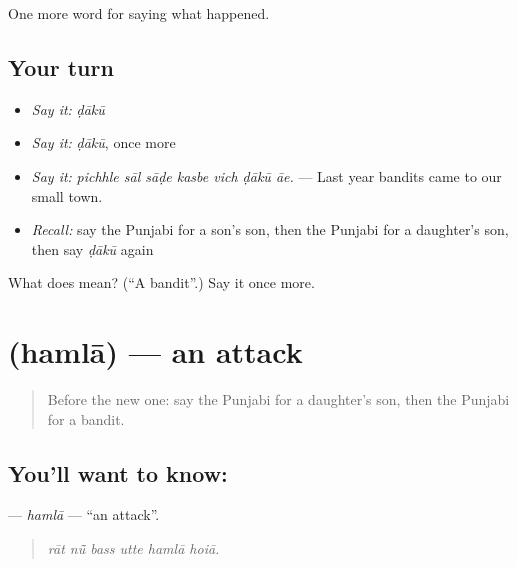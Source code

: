 \begin{grammarlens}[title={What you've built}]
One more word for saying what happened.
\end{grammarlens}

\subsection*{Your turn}
\begin{itemize}
\raggedright
  \item \emph{Say it:} \emph{ḍākū}
  \item \emph{Say it:} \emph{ḍākū}, once more
  \item \emph{Say it:} \emph{pichhle sāl sāḍe kasbe vich ḍākū āe.} — Last year bandits came to our small town.
  \item \emph{Recall:} say the Punjabi for a son's son, then the Punjabi for a daughter's son, then say \emph{ḍākū} again
\end{itemize}

\begin{tcolorbox}[breakable,colback=teal!4,colframe=teal!35!black,title={Before you move on}]
What does  mean? (\textquotedblleft{}A bandit\textquotedblright{}.) Say it once more.
\end{tcolorbox}
\section[\texorpdfstring{\pa{ਹਮਲਾ} (hamlā)}{ਹਮਲਾ (hamlā)}]{ (hamlā) — an attack}

\label{lesson:PA-C315-hamla}



\begin{quote}
Before the new one: say the Punjabi for a daughter's son, then the Punjabi for a bandit.
\end{quote}

\subsection*{You'll want to know: }
\textbf{} — \emph{hamlā} — \textquotedblleft{}an attack\textquotedblright{}.

\begin{quote}
     
\end{quote}

\begin{quote}
\emph{rāt nū̃ bass utte hamlā hoiā.}
\end{quote}


